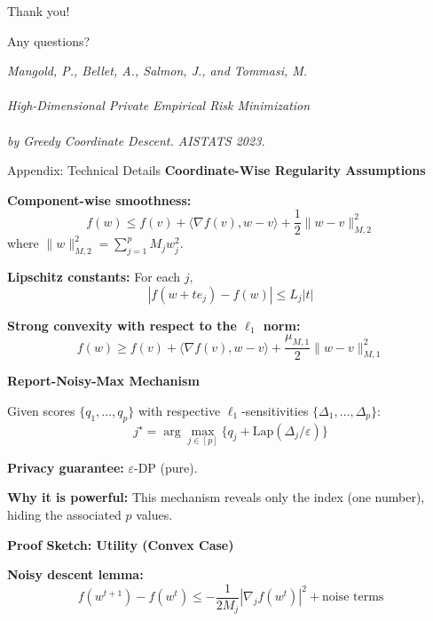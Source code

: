 \documentclass[10pt]{beamer}
\begin{document}
\begin{frame}[standout]
\Huge Thank you!
\vspace{2em}

\normalsize
Any questions?

\vspace{2em}
\footnotesize
\textit{Mangold, P., Bellet, A., Salmon, J., and Tommasi, M.\\\\
High-Dimensional Private Empirical Risk Minimization\\\\
by Greedy Coordinate Descent. AISTATS 2023.}
\end{frame}

\appendix

\begin{frame}[allowframebreaks]{Appendix: Technical Details}
\textbf{Coordinate-Wise Regularity Assumptions}

\vspace{0.5em}
\textbf{Component-wise smoothness:}
\[
f(w) \leq f(v) + \langle \nabla f(v), w - v \rangle + \frac{1}{2} \|w - v\|_{M,2}^2
\]
where $\|w\|_{M,2}^2 = \sum_{j=1}^p M_j w_j^2$.

\vspace{0.5em}
\textbf{Lipschitz constants:} For each $j$,
\[
|f(w + t e_j) - f(w)| \leq L_j |t|
\]

\vspace{0.5em}
\textbf{Strong convexity with respect to the $\ell_1$ norm:}
\[
f(w) \geq f(v) + \langle \nabla f(v), w - v \rangle + \frac{\mu_{M,1}}{2} \|w - v\|_{M,1}^2
\]

\framebreak

\textbf{Report-Noisy-Max Mechanism}

\vspace{0.5em}
Given scores $\{q_1, \ldots, q_p\}$ with respective $\ell_1$-sensitivities $\{\Delta_1, \ldots, \Delta_p\}$:
\[
j^\star = \arg\max_{j \in [p]} \{q_j + \text{Lap}(\Delta_j / \varepsilon)\}
\]

\textbf{Privacy guarantee:} $\varepsilon$-DP (pure).

\textbf{Why it is powerful:} This mechanism reveals only the index (one number), hiding the associated $p$ values.

\framebreak

\textbf{Proof Sketch: Utility (Convex Case)}

\vspace{0.5em}
\textbf{Noisy descent lemma:}
\[
f(w^{t+1}) - f(w^t) \leq -\frac{1}{2M_j} |\nabla_j f(w^t)|^2 + \text{noise terms}
\]


\end{frame}
\end{document}

